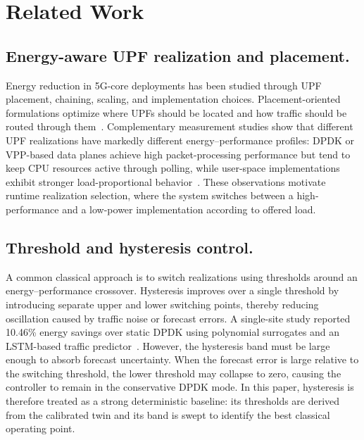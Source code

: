 \documentclass[10pt,conference,letterpaper]{IEEEtran}
\begin{document}
\section{Related Work}
\label{sec:related}
\subsection{Energy-aware UPF realization and placement.}
Energy reduction in 5G-core deployments has been studied through UPF placement,
chaining, scaling, and implementation choices. Placement-oriented formulations
optimize where UPFs should be located and how traffic should be routed through
them~\cite{ref:leyva}. Complementary measurement studies show that different
UPF realizations have markedly different energy--performance profiles: DPDK or
VPP-based data planes achieve high packet-processing performance but tend to
keep CPU resources active through polling, while user-space implementations
exhibit stronger load-proportional behavior~\cite{ref:christakis,ref:bolla}.
These observations motivate runtime realization selection, where the system
switches between a high-performance and a low-power implementation according to
offered load.

\subsection{Threshold and hysteresis control.}
A common classical approach is to switch realizations using thresholds around
an energy--performance crossover. Hysteresis improves over a single threshold by
introducing separate upper and lower switching points, thereby reducing
oscillation caused by traffic noise or forecast errors. A single-site study
reported 10.46\% energy savings over static DPDK using polynomial surrogates and
an LSTM-based traffic predictor~\cite{ref:slices}. However, the hysteresis band
must be large enough to absorb forecast uncertainty. When the forecast error is
large relative to the switching threshold, the lower threshold may collapse to
zero, causing the controller to remain in the conservative DPDK mode. In this
paper, hysteresis is therefore treated as a strong deterministic baseline: its
thresholds are derived from the calibrated twin and its band is swept to identify
the best classical operating point.
\end{document}
